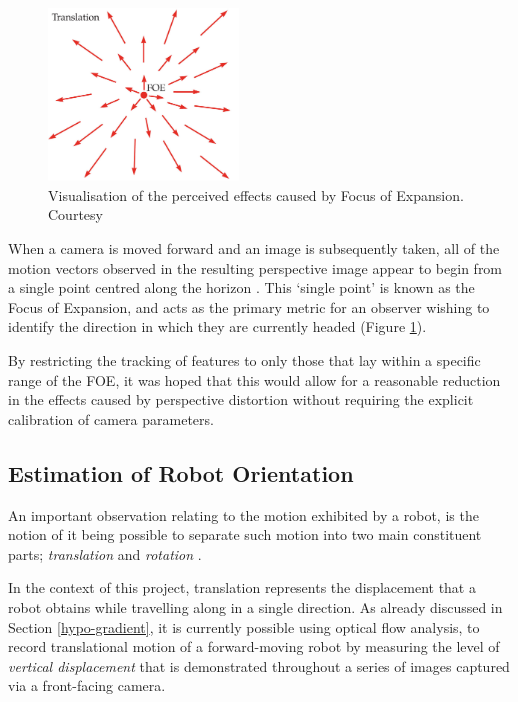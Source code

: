 \begin{figure}
\vspace{-20pt}
  \begin{center}
    \includegraphics[width=0.45\textwidth]{images/foe.png}
  \end{center}
  \vspace{-10pt}
  \caption{Visualisation of the perceived effects caused by Focus of Expansion. Courtesy \cite{texas-cs}}
  \label{fig:foe}
  \vspace{-20pt}
\end{figure}

When a camera is moved forward and an image is subsequently taken, all of the motion vectors observed in the resulting perspective image appear to begin from a single point centred along the horizon \cite{stanford-cs}. This `single point' is known as the Focus of Expansion, and acts as the primary metric for an observer wishing to identify the direction in which they are currently headed \cite{texas-cs} (Figure \ref{fig:foe}). 
 
By restricting the tracking of features to only those that lay within a specific range of the FOE, it was hoped that this would allow for a reasonable reduction in the effects caused by perspective distortion without requiring the explicit calibration of camera parameters. 

\subsection{Estimation of Robot Orientation}
\label{hypo-rotation}
An important observation relating to the motion exhibited by a robot, is the notion of it being possible to separate such motion into two main constituent parts; \textit{translation} and \textit{rotation} \cite{campbell}. 

In the context of this project, translation represents the displacement that a robot obtains while travelling along in a single direction. As already discussed in Section \ref{hypo-gradient}, it is currently possible using optical flow analysis, to record translational motion of a forward-moving robot by measuring the level of \textit{vertical displacement} that is demonstrated throughout a series of images captured via a front-facing camera.

